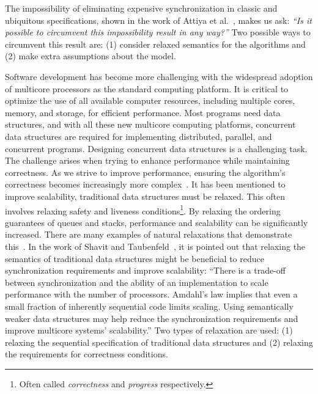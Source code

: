 The impossibility of eliminating expensive synchronization in classic and ubiquitous specifications, shown in the work of Attiya et al.~\cite{DBLP_conf_popl_AttiyaGHKMV11}, makes us ask: \textit{``Is it possible to circumvent this impossibility result in any way?''} Two possible ways to circumvent this result are: (1) consider relaxed semantics for the algorithms and (2) make extra assumptions about the model. 

Software development has become more challenging with the widespread adoption of multicore processors as the standard computing platform. It is critical to optimize the use of all available computer resources, including multiple cores, memory, and storage, for efficient performance. Most programs need data structures, and with all these new multicore computing platforms, concurrent data structures are required for implementing distributed, parallel, and concurrent programs. Designing concurrent data structures is a challenging task. The challenge arises when trying to enhance performance while maintaining correctness. As we strive to improve performance, ensuring the algorithm's correctness becomes increasingly more complex~\cite{DBLP_journals_cacm_Shavit11}. It has been mentioned to improve scalability, traditional data structures must be relaxed. This often involves relaxing safety and liveness conditions\footnote{Often called \textit{correctness} and \textit{progress} respectively.}. By relaxing the ordering guarantees of queues and stacks, performance and scalability can be significantly increased. There are many examples of natural relaxations that demonstrate this~\cite{DBLP_journals_cacm_Shavit11}. In the work of Shavit and Taubenfeld~\cite{DBLP_journals_dc_ShavitT16}, it is pointed out that relaxing the semantics of traditional data structures might be beneficial to reduce synchronization requirements and improve scalability: ``There is a trade-off between synchronization and the ability of an implementation to scale performance with the number of processors. Amdahl’s law implies that even a small fraction of inherently sequential code limits scaling. Using semantically weaker data structures may help reduce the synchronization requirements and improve multicore systems' scalability.''
Two types of relaxation are used: (1) relaxing the sequential specification of traditional data structures and (2) relaxing the requirements for correctness conditions. 

